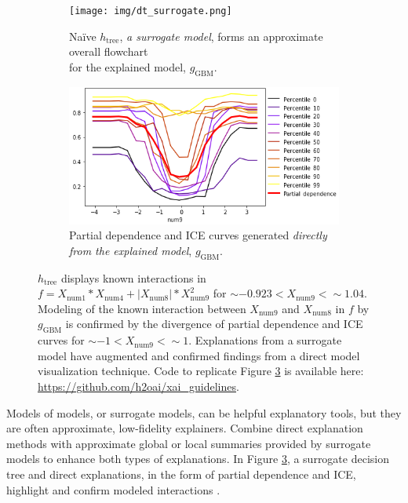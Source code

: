 \documentclass[sigconf]{acmart}
\begin{document}
\begin{figure}[htb!]
	\begin{subfigure}{.55\textwidth}	\centering
		\texttt{[image: img/dt\_surrogate.png]}
  		\caption{Na\"ive $h_{\text{tree}}$, \textit{a surrogate model}, forms an approximate overall flowchart\\ for the explained model, $g_{\text{GBM}}$.}
  		\label{fig:dt_surrogate}
	\end{subfigure}\hfill
	\begin{subfigure}{.45\textwidth}	\centering
  		\includegraphics[height=0.4\linewidth, width=0.75\linewidth]{img/pdp_ice.png}
  		\caption{Partial dependence and ICE curves generated \textit{directly from the explained model}, $g_{\text{GBM}}$.}
  		\label{fig:pdp_ice}
	\end{subfigure} \vspace{-5pt}
	\caption{$h_{\text{tree}}$ displays known interactions in $f = X_{\text{num}1} * X_{\text{num}4} + |X_{\text{num}8}| * X_{\text{num}9}^2$ for $\sim -0.923 < X_{\text{num9}} <  \sim 1.04$. Modeling of the known interaction between $X_{\text{num9}}$ and $X_{\text{num8}}$ in $f$ by $g_{\text{GBM}}$ is confirmed by the divergence of partial dependence and ICE curves for $\sim -1 < X_{\text{num9}} <  \sim 1$. Explanations from a surrogate model have augmented and confirmed findings from a direct model visualization technique. Code to replicate Figure \ref{fig:pdp_ice_dt_surrogate} is available here: \url{https://github.com/h2oai/xai_guidelines}.}
	\label{fig:pdp_ice_dt_surrogate}
\end{figure}

Models of models, or surrogate models, can be helpful explanatory tools, but they are often approximate, low-fidelity explainers. Combine direct explanation methods with approximate global or local summaries provided by surrogate models to enhance both types of explanations. In Figure \ref{fig:pdp_ice_dt_surrogate}, a surrogate decision tree and direct explanations, in the form of partial dependence and ICE, highlight and confirm modeled interactions \cite{art_and_sci}.
\end{document}

